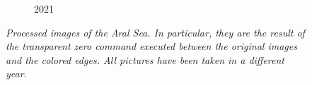 \documentclass[12pt,a4paper]{article}
\begin{document}
\begin{figure}
\begin{subfigure}[b]{0.19\textwidth}
        \caption{2021}
    \end{subfigure}
    \caption{\emph{Processed images of the Aral Sea.
            In particular, they are the result of the transparent zero command executed between the original images and the colored edges.
            All pictures have been taken in a different year.}}
    \label{fig:appendixedges}
\end{figure}

\printbibliography
\end{document}
